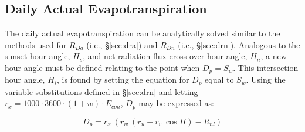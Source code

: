 \subsection{Daily Actual Evapotranspiration}
\label{sec:daet}
The daily actual evapotranspiration can be analytically solved similar to the methods used for $R_{Da}$ (i.e., \S \ref{sec:dra}) and $R_{Dn}$ (i.e., \S \ref{sec:drn}). 
Analogous to the sunset hour angle, $H_s$, and net radiation flux cross-over hour angle, $H_n$, a new hour angle must be defined relating to the point when $D_p = S_w$. 
This intersection hour angle, $H_i$, is found by setting the equation for $D_p$ equal to $S_w$. 
Using the variable substitutions defined in \S \ref{sec:drn} and letting $r_x = 1000\cdot 3600\cdot\left(1+w\right)\cdot E_{con}$, $D_p$ may be expressed as:

\begin{equation}
\label{eq:dpb}
	D_p = r_x\:\left(
		 r_w\:\left(r_u+r_v\:\cos H\right)- R_{nl} 
		 \right)
\end{equation}

